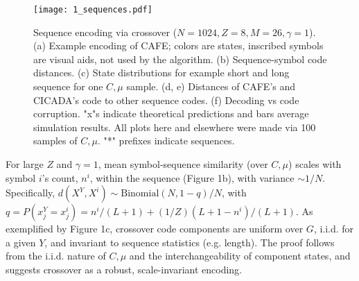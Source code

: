 \documentclass{article}
\begin{document}
\begin{figure}
  \centering
  \texttt{[image: 1\_sequences.pdf]}
  \caption{Sequence encoding via crossover ($N=1024, Z=8, M=26, \gamma=1$). (a) Example encoding of CAFE; colors are states, inscribed symbols are visual aids, not used by the algorithm. (b) Sequence-symbol code distances. (c) State distributions for example short and long sequence for one $C, \mu$ sample. (d, e) Distances of CAFE's and CICADA's code to other sequence codes. (f) Decoding vs code corruption. "x"s indicate theoretical predictions and bars average simulation results. All plots here and elsewhere were made via 100 samples of $C, \mu$. "*" prefixes indicate sequences.}
  \label{fig:1}
\end{figure}

For large $Z$ and $\gamma = 1$, mean symbol-sequence similarity (over $C, \mu$) scales with symbol $i$'s count, $n^i$, within the sequence (Figure 1b), with variance $\sim 1/N$. Specifically, $d(X^Y, X^i) \sim \textrm{Binomial}(N, 1-q)/N$, with $q = P(x^Y_j = x^i_j) = n^i/(L+1) + (1/Z)(L+1-n^i)/(L+1)$. As exemplified by Figure 1c, crossover code components are uniform over $G$, i.i.d. for a given $Y$, and invariant to sequence statistics (e.g. length). The proof follows from the i.i.d. nature of $C, \mu$ and the interchangeability of component states, and suggests crossover as a robust, scale-invariant encoding.
\end{document}
